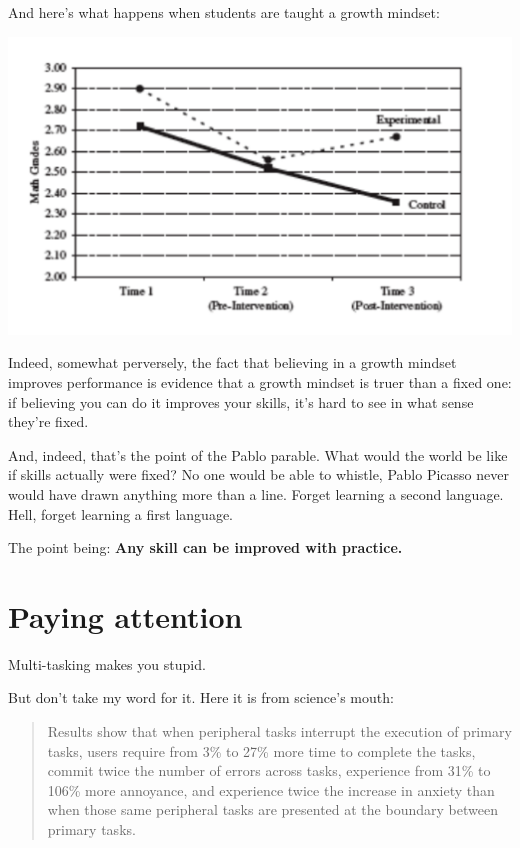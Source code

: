 And here's what happens when students are taught a growth mindset:

\includegraphics[width=\textwidth]{graphics/math-intervention-dweck}

Indeed, somewhat perversely, the fact that believing in a growth mindset
improves performance is evidence that a growth mindset is truer than a fixed
one: if believing you can do it improves your skills, it's hard to see in what
sense they're fixed.

And, indeed, that's the point of the Pablo parable. What would the world be like
if skills actually were fixed? No one would be able to whistle, Pablo Picasso
never would have drawn anything more than a line. Forget learning a second
language. Hell, forget learning a first language.

The point being: \textbf{Any skill can be improved with practice.}

\section{Paying attention}

Multi-tasking makes you stupid.

But don't take my word for it. Here it is from science's mouth:

\begin{quote}
Results show that when peripheral tasks interrupt the execution of primary
tasks, users require from 3\% to 27\% more time to complete the tasks, commit
twice the number of errors across tasks, experience from 31\% to 106\% more
annoyance, and experience twice the increase in anxiety than when those same
peripheral tasks are presented at the boundary between primary tasks.\cite{bailey2006need}
\end{quote}

